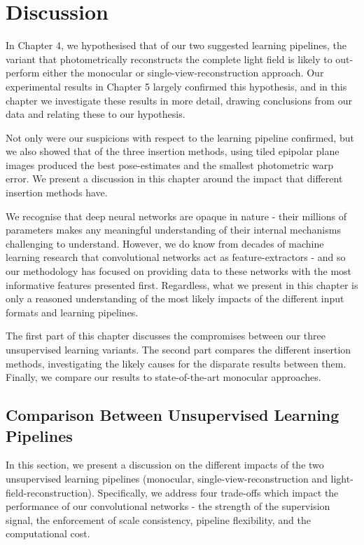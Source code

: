 \chapter{Discussion}

In Chapter 4, we hypothesised that of our two suggested learning pipelines, the variant that photometrically reconstructs the complete light field is likely to out-perform either the monocular or single-view-reconstruction approach. Our experimental results in Chapter 5 largely confirmed this hypothesis, and in this chapter we investigate these results in more detail, drawing conclusions from our data and relating these to our hypothesis. 

Not only were our suspicions with respect to the learning pipeline confirmed, but we also showed that of the three insertion methods, using tiled epipolar plane images produced the best pose-estimates and the smallest photometric warp error. We present a discussion in this chapter around the impact that different insertion methods have.

We recognise that deep neural networks are opaque in nature - their millions of parameters makes any meaningful understanding of their internal mechanisms challenging to understand. However, we do know from decades of machine learning research that convolutional networks act as feature-extractors - and so our methodology has focused on providing data to these networks with the most informative features presented first. Regardless, what we present in this chapter is only a reasoned understanding of the most likely impacts of the different input formats and learning pipelines.  

The first part of this chapter discusses the compromises between our three unsupervised learning variants. The second part compares the different insertion methods, investigating the likely causes for the disparate results between them. Finally, we compare our results to state-of-the-art monocular approaches. 


\section{Comparison Between Unsupervised Learning Pipelines}

In this section, we present a discussion on the different impacts of the two unsupervised learning pipelines (monocular, single-view-reconstruction and light-field-reconstruction). Specifically, we address four trade-offs which impact the performance of our convolutional networks - the strength of the supervision signal, the enforcement of scale consistency, pipeline flexibility, and the computational cost. 

